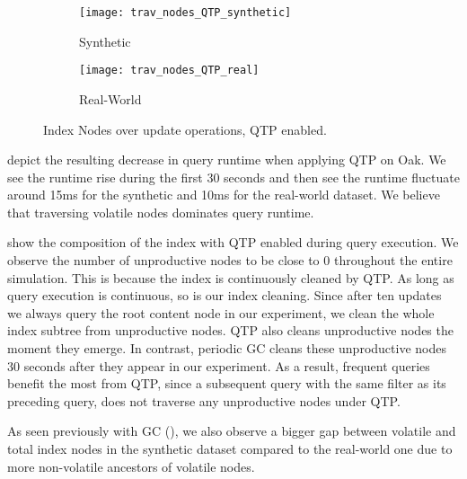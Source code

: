 \documentclass[abstracton,12pt]{scrartcl}
\theoremstyle{definition}
\begin{document}
\begin{figure}[t]
  \centering
  \begin{subfigure}{0.49\linewidth}
    \centering
    \caption{Synthetic}
    \texttt{[image: trav\_nodes\_QTP\_synthetic]}
    \label{fig:trav_nodes_QTP_synthetic}
  \end{subfigure}
  \begin{subfigure}{0.49\linewidth}
    \centering
    \caption{Real-World}
    \texttt{[image: trav\_nodes\_QTP\_real]}
    \label{fig:trav_nodes_QTP_real}
  \end{subfigure}
  \vspace{-0.5cm}
  \caption[Index Nodes over accumulated update operations, QTP enabled]{
  Index Nodes over update operations, QTP enabled.}
\end{figure}

 depict the
resulting decrease in query runtime when applying QTP on Oak. We see the runtime
rise during the first 30 seconds and then see the runtime fluctuate around
15ms for the synthetic and 10ms for the real-world dataset.
We believe that traversing volatile nodes dominates query runtime. 

 show the composition
of the index with QTP enabled during query execution. We observe the number of
unproductive nodes to be close to 0 throughout the entire simulation. This is
because the index is continuously cleaned by QTP. As long as query execution is
continuous, so is our index cleaning. Since after ten updates we always query the root content
node in our experiment, we clean the whole index subtree from unproductive nodes.
QTP also cleans unproductive nodes the moment they emerge. In contrast, periodic GC
cleans these unproductive nodes 30 seconds after they appear in our experiment.
As a result, frequent queries benefit the most from QTP, since a subsequent query with
the same filter as its preceding query, 
does not traverse any unproductive nodes under QTP.

As seen previously with GC (), 
we also observe a bigger gap between volatile and total
index nodes in the synthetic dataset compared to the real-world one due to
more non-volatile ancestors of volatile nodes.

\end{document}
